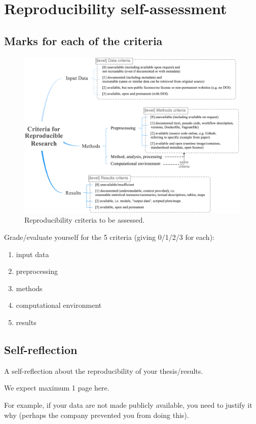 

\chapter{Reproducibility self-assessment}

\section{Marks for each of the criteria}

\begin{figure}[h]
  \centering
  \includegraphics[width=0.8\linewidth]{figs/reproducibility_criteria.png}
  \caption{Reproducibility criteria to be assessed.}
\label{fig:reproducibility_criteria}
\end{figure}

Grade/evaluate yourself for the 5 criteria (giving 0/1/2/3 for each):
\begin{enumerate}
  \item input data
  \item preprocessing
  \item methods
  \item computational environment
  \item results
\end{enumerate}


\section{Self-reflection} 

A self-reflection about the reproducibility of your thesis/results.

We expect maximum 1 page here.

For example, if your data are not made publicly available, you need to justify it why (perhaps the company prevented you from doing this).
